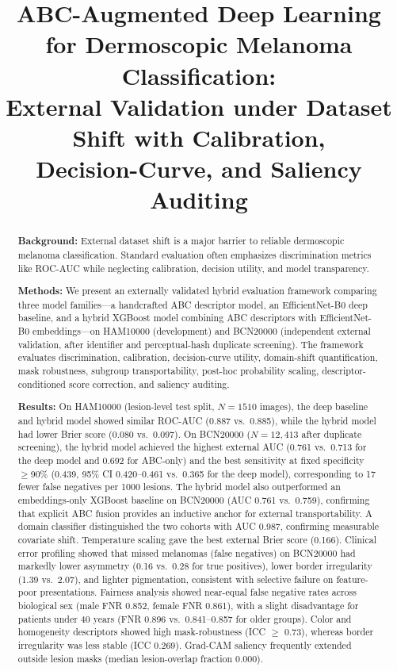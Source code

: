 \documentclass[preprint,12pt]{elsarticle}
\begin{document}
\begin{frontmatter}

\title{ABC-Augmented Deep Learning for Dermoscopic Melanoma Classification:\\ External Validation under Dataset Shift with Calibration,\\ Decision-Curve, and Saliency Auditing}

\begin{abstract}
\textbf{Background:} External dataset shift is a major barrier to reliable dermoscopic melanoma classification. Standard evaluation often emphasizes discrimination metrics like ROC-AUC while neglecting calibration, decision utility, and model transparency.

\textbf{Methods:} We present an externally validated hybrid evaluation framework comparing three model families---a handcrafted ABC descriptor model, an EfficientNet-B0 deep baseline, and a hybrid XGBoost model combining ABC descriptors with EfficientNet-B0 embeddings---on HAM10000 (development) and BCN20000 (independent external validation, after identifier and perceptual-hash duplicate screening). The framework evaluates discrimination, calibration, decision-curve utility, domain-shift quantification, mask robustness, subgroup transportability, post-hoc probability scaling, descriptor-conditioned score correction, and saliency auditing.

\textbf{Results:} On HAM10000 (lesion-level test split, $N = 1510$ images), the deep baseline and hybrid model showed similar ROC-AUC (0.887 vs.\ 0.885), while the hybrid model had lower Brier score (0.080 vs.\ 0.097). On BCN20000 ($N = 12{,}413$ after duplicate screening), the hybrid model achieved the highest external AUC (0.761 vs.\ 0.713 for the deep model and 0.692 for ABC-only) and the best sensitivity at fixed specificity $\geq$90\% (0.439, 95\% CI 0.420--0.461 vs.\ 0.365 for the deep model), corresponding to 17 fewer false negatives per 1000 lesions. The hybrid model also outperformed an embeddings-only XGBoost baseline on BCN20000 (AUC 0.761 vs.\ 0.759), confirming that explicit ABC fusion provides an inductive anchor for external transportability. A domain classifier distinguished the two cohorts with AUC 0.987, confirming measurable covariate shift. Temperature scaling gave the best external Brier score (0.166). Clinical error profiling showed that missed melanomas (false negatives) on BCN20000 had markedly lower asymmetry (0.16 vs.\ 0.28 for true positives), lower border irregularity (1.39 vs.\ 2.07), and lighter pigmentation, consistent with selective failure on feature-poor presentations. Fairness analysis showed near-equal false negative rates across biological sex (male FNR 0.852, female FNR 0.861), with a slight disadvantage for patients under 40 years (FNR 0.896 vs.\ 0.841--0.857 for older groups). Color and homogeneity descriptors showed high mask-robustness (ICC $\geq$ 0.73), whereas border irregularity was less stable (ICC 0.269). Grad-CAM saliency frequently extended outside lesion masks (median lesion-overlap fraction 0.000).


\end{abstract}
\end{frontmatter}
\end{document}
